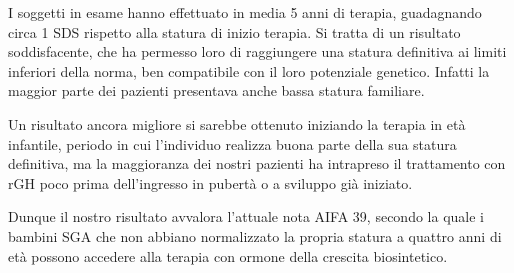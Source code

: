 \documentclass[12pt,a4paper]{article}
\begin{document}
I soggetti in esame hanno effettuato in media 5 anni di terapia, guadagnando circa 1 SDS rispetto alla statura di inizio terapia. Si tratta di un risultato soddisfacente, che ha permesso loro di raggiungere una statura definitiva ai limiti inferiori della norma, ben compatibile con il loro potenziale genetico. Infatti la maggior parte dei pazienti presentava anche bassa statura familiare. 

Un risultato ancora migliore si sarebbe ottenuto iniziando la terapia in età infantile, periodo in cui l'individuo realizza buona parte della sua statura definitiva, ma la maggioranza dei nostri pazienti ha intrapreso il trattamento con rGH poco prima dell'ingresso in pubertà o a sviluppo già iniziato.

Dunque il nostro risultato avvalora l'attuale nota AIFA 39, secondo la quale i bambini SGA che non abbiano normalizzato la propria statura a quattro anni di età possono accedere alla terapia con ormone della crescita biosintetico.  



 
\end{document}
